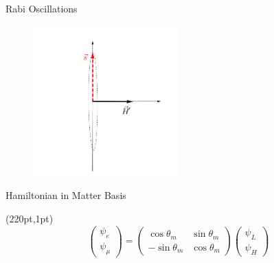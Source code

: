 \documentclass[9pt]{beamer}
\begin{document}
\begin{darkframes}
\begin{frame}{Rabi Oscillations}
{\begin{figure}
    \centering
    \includegraphics[width=0.5\textwidth]{assets/rabi-isospin-rotating-frame-resonance}
\end{figure}


}





\end{frame}



\begin{frame}{Hamiltonian in Matter Basis}

\begin{textblock*}{10pt}(220pt,1pt)
\small
\begin{equation*}
\begin{pmatrix}
\psi_e\\
\psi_\mu
\end{pmatrix} = \begin{pmatrix}
\cos \theta_m & \sin\theta_m \\
-\sin \theta_m & \cos \theta_m
\end{pmatrix}\begin{pmatrix}
\psi_L\\
\psi_H
\end{pmatrix}
\end{equation*}


\end{textblock*}
\end{frame}
\end{darkframes}
\end{document}
